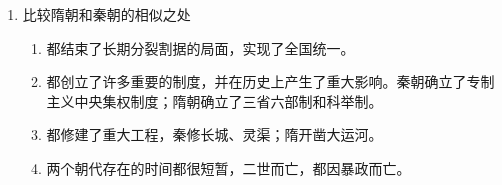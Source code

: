 \documentclass[12pt, a4paper, oneside]{ctexart}
\begin{document}
\begin{enumerate}
\begin{enumerate}
\begin{enumerate}
					\end{enumerate}
				\item 比较隋朝和秦朝的相似之处
					\begin{enumerate}
						\item 都结束了长期分裂割据的局面，实现了全国统一。
						\item 都创立了许多重要的制度，并在历史上产生了重大影响。秦朝确立了专制主义中央集权制度；隋朝确立了三省六部制和科举制。
						\item 都修建了重大工程，秦修长城、灵渠；隋开凿大运河。
						\item 两个朝代存在的时间都很短暂，二世而亡，都因暴政而亡。
					\end{enumerate}
			\end{enumerate}
		\end{enumerate}
		
\end{document}
